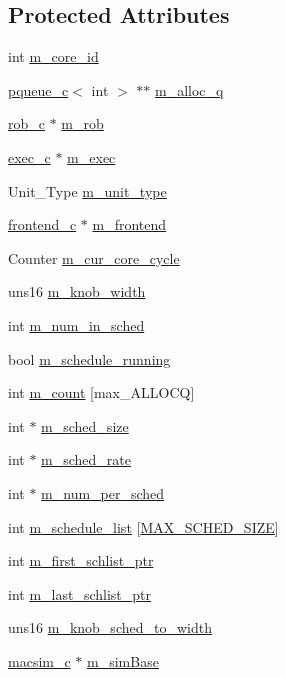\subsection*{Protected Attributes}
\begin{DoxyCompactItemize}
\item 
int \hyperlink{classschedule__c_a6c4f8484b3f2dae8255c0ce064f9d46e}{m\_\-core\_\-id}
\item 
\hyperlink{classpqueue__c}{pqueue\_\-c}$<$ int $>$ $\ast$$\ast$ \hyperlink{classschedule__c_a54abfd4e67cf5e137e5f47ce52e8d903}{m\_\-alloc\_\-q}
\item 
\hyperlink{classrob__c}{rob\_\-c} $\ast$ \hyperlink{classschedule__c_a440a3a31b8fd41afae103a4b0ed3f49c}{m\_\-rob}
\item 
\hyperlink{classexec__c}{exec\_\-c} $\ast$ \hyperlink{classschedule__c_a75e32c0fe0d1ad336ada30787fceafd8}{m\_\-exec}
\item 
Unit\_\-Type \hyperlink{classschedule__c_a5fd7913b69e838b56da18de2802d8a71}{m\_\-unit\_\-type}
\item 
\hyperlink{classfrontend__c}{frontend\_\-c} $\ast$ \hyperlink{classschedule__c_a88ee09e9569c248374f0c943a4b73987}{m\_\-frontend}
\item 
Counter \hyperlink{classschedule__c_af4317f5116645b5847cef02ec5b6491c}{m\_\-cur\_\-core\_\-cycle}
\item 
uns16 \hyperlink{classschedule__c_a64a19cfe161bf6e7833bb8133849da67}{m\_\-knob\_\-width}
\item 
int \hyperlink{classschedule__c_a28362ea19de72375832f204b8d447237}{m\_\-num\_\-in\_\-sched}
\item 
bool \hyperlink{classschedule__c_a70ea92418d7c7b8e26a10c187ec0f57e}{m\_\-schedule\_\-running}
\item 
int \hyperlink{classschedule__c_a0dc86a2612108d557b5d9b4147b93a84}{m\_\-count} \mbox{[}max\_\-ALLOCQ\mbox{]}
\item 
int $\ast$ \hyperlink{classschedule__c_a3d8d6881abaa41ccccf6f173a23cc2bd}{m\_\-sched\_\-size}
\item 
int $\ast$ \hyperlink{classschedule__c_a04f5ccf337d6b385a6c50ed669343096}{m\_\-sched\_\-rate}
\item 
int $\ast$ \hyperlink{classschedule__c_a38b31f54c703cfde77a130c7a0cf2b9d}{m\_\-num\_\-per\_\-sched}
\item 
int \hyperlink{classschedule__c_adf653bc23f928cd4bed7db1200b53483}{m\_\-schedule\_\-list} \mbox{[}\hyperlink{classschedule__c_a1421dabfdead10b493bab949d79c2855}{MAX\_\-SCHED\_\-SIZE}\mbox{]}
\item 
int \hyperlink{classschedule__c_aa8a352d3017c16bf63d36ec12541238d}{m\_\-first\_\-schlist\_\-ptr}
\item 
int \hyperlink{classschedule__c_abfdb3ae734434b3a86c2402cf3d7e22c}{m\_\-last\_\-schlist\_\-ptr}
\item 
uns16 \hyperlink{classschedule__c_a92d6480db2a509909d356fc6b10d5d73}{m\_\-knob\_\-sched\_\-to\_\-width}
\item 
\hyperlink{classmacsim__c}{macsim\_\-c} $\ast$ \hyperlink{classschedule__c_a0db71234050b2c33f454b5d65d458564}{m\_\-simBase}
\end{DoxyCompactItemize}
